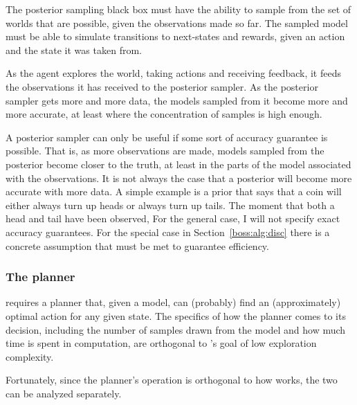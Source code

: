 The posterior sampling black box must have the ability to sample from the set of worlds that are possible, given the observations made so far. The sampled model must be able to simulate transitions to next-states and rewards, given an action and the state it was taken from.

As the agent explores the world, taking actions and receiving feedback, it feeds the observations it has received to the posterior sampler. As the posterior sampler gets more and more data, the models sampled from it become more and more accurate, at least where the concentration of samples is high enough.

A posterior sampler can only be useful if some sort of accuracy guarantee is possible. That is, as more observations are made, models sampled from the posterior become closer to the truth, at least in the parts of the model associated with the observations. It is not always the case that a posterior will become more accurate with more data. A simple example is a prior that says that a coin will either always turn up heads or always turn up tails. The moment that both a head and tail have been observed, 
For the general case, I will not specify exact accuracy guarantees. For the special case in Section~\ref{boss:alg:disc} there is a concrete assumption that must be met to guarantee efficiency.

\subsubsection{The planner}

 requires a planner that, given a model, can (probably) find an (approximately) optimal action for any given state. The specifics of how the planner comes to its decision, including the number of samples drawn from the model and how much time is spent in computation, are orthogonal to 's goal of low exploration complexity.

Fortunately, since the planner's operation is orthogonal to how  works, the two can be analyzed separately.


